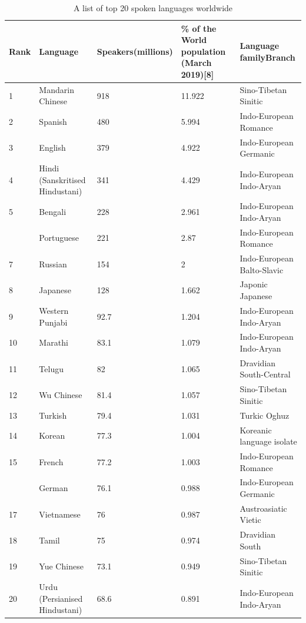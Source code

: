 \documentclass[
  openany]{book}
\begin{document}
\begin{longtable}[t]{lllll}
\caption{\label{tab:world-language}A list of top 20 spoken languages worldwide}\\
\toprule
Rank & Language & Speakers(millions) & \% of the World population
(March 2019)[8] & Language familyBranch\\
\midrule
\rowcolor{gray!6}  1 & Mandarin Chinese & 918 & 11.922 & Sino-Tibetan Sinitic\\
2 & Spanish & 480 & 5.994 & Indo-European Romance\\
\rowcolor{gray!6}  3 & English & 379 & 4.922 & Indo-European Germanic\\
4 & Hindi (Sanskritised Hindustani) & 341 & 4.429 & Indo-European Indo-Aryan\\
\rowcolor{gray!6}  5 & Bengali & 228 & 2.961 & Indo-European Indo-Aryan\\
\addlinespace
6 & Portuguese & 221 & 2.87 & Indo-European Romance\\
\rowcolor{gray!6}  7 & Russian & 154 & 2 & Indo-European Balto-Slavic\\
8 & Japanese & 128 & 1.662 & Japonic Japanese\\
\rowcolor{gray!6}  9 & Western Punjabi & 92.7 & 1.204 & Indo-European Indo-Aryan\\
10 & Marathi & 83.1 & 1.079 & Indo-European Indo-Aryan\\
\addlinespace
\rowcolor{gray!6}  11 & Telugu & 82 & 1.065 & Dravidian South-Central\\
12 & Wu Chinese & 81.4 & 1.057 & Sino-Tibetan Sinitic\\
\rowcolor{gray!6}  13 & Turkish & 79.4 & 1.031 & Turkic Oghuz\\
14 & Korean & 77.3 & 1.004 & Koreanic language isolate\\
\rowcolor{gray!6}  15 & French & 77.2 & 1.003 & Indo-European Romance\\
\addlinespace
16 & German & 76.1 & 0.988 & Indo-European Germanic\\
\rowcolor{gray!6}  17 & Vietnamese & 76 & 0.987 & Austroasiatic Vietic\\
18 & Tamil & 75 & 0.974 & Dravidian South\\
\rowcolor{gray!6}  19 & Yue Chinese & 73.1 & 0.949 & Sino-Tibetan Sinitic\\
20 & Urdu (Persianised Hindustani) & 68.6 & 0.891 & Indo-European Indo-Aryan\\
\bottomrule
\end{longtable}
\end{document}
